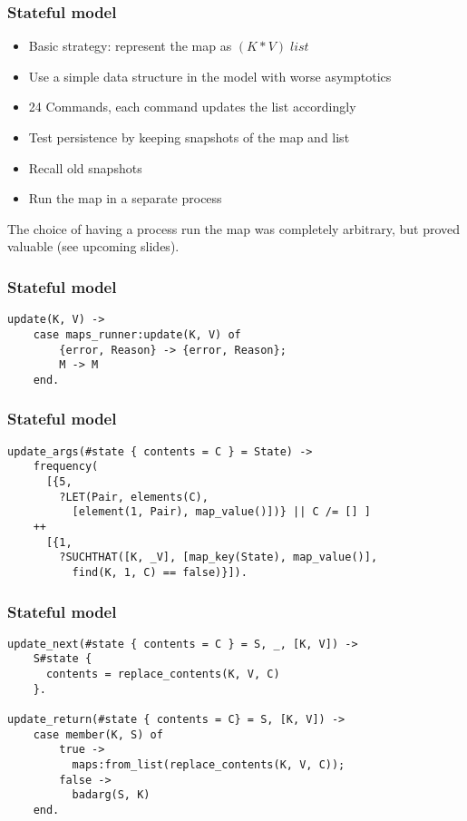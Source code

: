 \documentclass[lualatex]{beamer}
\begin{document}
\begin{frame}[fragile]
\frametitle{Stateful model}

\begin{itemize}
\item Basic strategy: represent the map as $(K * V) \; list$
\item Use a simple data structure in the model with worse asymptotics
\item 24 Commands, each command updates the list accordingly
\item Test persistence by keeping snapshots of the map and list
\item Recall old snapshots
\item Run the map in a separate process
\end{itemize}

The choice of having a process run the map was completely arbitrary, but proved valuable (see upcoming slides).

\end{frame}

\begin{frame}[fragile]
\frametitle{Stateful model}

\begin{verbatim}
update(K, V) ->
    case maps_runner:update(K, V) of
        {error, Reason} -> {error, Reason};
        M -> M
    end.
\end{verbatim}
\end{frame}

\begin{frame}[fragile]
\frametitle{Stateful model}
\begin{verbatim}
update_args(#state { contents = C } = State) ->
    frequency(
      [{5,
        ?LET(Pair, elements(C),
          [element(1, Pair), map_value()])} || C /= [] ]
    ++
      [{1,
        ?SUCHTHAT([K, _V], [map_key(State), map_value()],
          find(K, 1, C) == false)}]).
\end{verbatim}
\end{frame}

\begin{frame}[fragile]
\frametitle{Stateful model}
\begin{verbatim}
update_next(#state { contents = C } = S, _, [K, V]) ->
    S#state {
      contents = replace_contents(K, V, C)
    }.

update_return(#state { contents = C} = S, [K, V]) ->
    case member(K, S) of
        true ->
          maps:from_list(replace_contents(K, V, C));
        false ->
          badarg(S, K)
    end.
\end{verbatim}
\end{frame}
\end{document}
